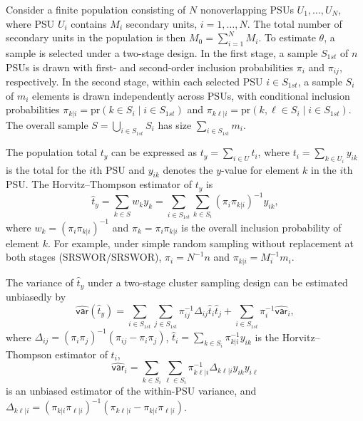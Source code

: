 Consider a finite population consisting of \(N\) nonoverlapping PSUs \(U_1, \ldots, U_N\), where PSU \(U_i\) contains \(M_i\) secondary units, \(i = 1, \ldots, N\). The total number of secondary units in the population is then \(M_0 = \sum_{i=1}^N M_i\). To estimate \(\theta\), a sample is selected under a two-stage design. In the first stage, a sample \(\textrm{$S$}_{1st}\) of \(n\) PSUs is drawn with first- and second-order inclusion probabilities \(\pi_i\) and \(\pi_{ij}\), respectively. In the second stage, within each selected PSU \(i \in \textrm{$S$}_{1st}\), a sample \(\textrm{$S$}_i\) of \(m_i\) elements is drawn independently across PSUs, with conditional inclusion probabilities \(\pi_{k|i} = \mathrm{pr}(k \in \textrm{$S$}_i \mid i \in \textrm{$S$}_{1st})\) and \(\pi_{k\textrm{$\ell$}|i} = \mathrm{pr}(k, \textrm{$\ell$}\in \textrm{$S$}_i \mid i \in \textrm{$S$}_{1st})\). The overall sample \(\textrm{$S$}= \bigcup_{i \in \textrm{$S$}_{1st}} \textrm{$S$}_i\) has size \(\sum_{i \in \textrm{$S$}_{1st}} m_i\).

The population total \(t_y\) can be expressed as \(t_y = \sum_{i \in U} t_i\), where \(t_i = \sum_{k \in U_i} y_{ik}\) is the total for the \(i\)th PSU and \(y_{ik}\) denotes the \(y\)-value for element \(k\) in the \(i\)th PSU. The Horvitz--Thompson estimator of \(t_y\) is
\[
    \hat{t}_{y}=\sum_{k \in \textrm{$S$}}w_k y_{k}=\sum_{i \in \textrm{$S$}_{1st}} \sum_{k \in \textrm{$S$}_i} (\pi_i \pi_{k |i})^{-1} y_{ik},
\]
where \(w_k = (\pi_i \pi_{k|i})^{-1}\) and \(\pi_k = \pi_i \pi_{k|i}\) is the overall inclusion probability of element \(k\). For example, under simple random sampling without replacement at both stages (SRSWOR/SRSWOR), \(\pi_i = N^{-1}n\) and \(\pi_{k|i} = M_i^{-1}m_i\).

The variance of \(\hat t_{y}\) under a two-stage cluster sampling design can be estimated unbiasedly by
\begin{equation}
    \hat {\mathsf{var}}(\hat {t}_{y})=\sum_{i \in \textrm{$S$}_{1st}}\sum_{j\in \textrm{$S$}_{1st}} \pi_{ij}^{-1}\Delta_{ij} \hat {t}_i \hat {t}_j  +\sum_{i \in \textrm{$S$}_{1st}}\pi_i^{-1}\hat {\mathsf{var}}_i,
\label{eq:VarHat2Stage}
\end{equation}
where \(\Delta_{ij} = (\pi_i \pi_j)^{-1}(\pi_{ij}-\pi_i \pi_j)\), \(\hat t_i=\sum_{k \in \textrm{$S$}_i} \pi_{k|i}^{-1} y_{ik}\) is the Horvitz--Thompson estimator of \(t_i\),
\[
    \hat {\mathsf{var}}_i=\sum_{k\in \textrm{$S$}_i}\sum_{\textrm{$\ell$}\in \textrm{$S$}_i} \pi_{k\textrm{$\ell$}|i}^{-1}\Delta_{k\textrm{$\ell$}|i} y_{ik} y_{i\textrm{$\ell$}}
\]
is an unbiased estimator of the within-PSU variance, and \(\Delta_{k\textrm{$\ell$}|i}=(\pi_{k|i}\pi_{\textrm{$\ell$}|i})^{-1}(\pi_{k\textrm{$\ell$}|i}-\pi_{k|i}\pi_{\textrm{$\ell$}|i})\).

